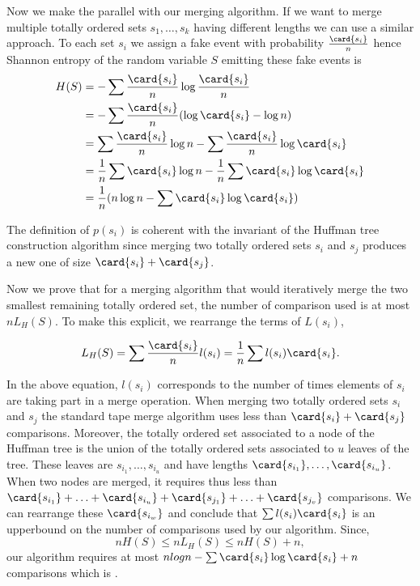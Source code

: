 Now we make the parallel with our merging algorithm. If we want to merge
multiple totally ordered sets \(s_1,\ldots,s_k\) having different lengths we can use a similar
approach. To each set \(s_i\) we assign a fake event with probability
\(\frac{\card{s_i}}{n}\) hence Shannon entropy of the random variable
\(S\) emitting these fake events is
\begin{align}
H(S) &= - \sum \frac{\card{s_i}}{n} \log \frac{\card{s_i}}{n}\\
&= - \sum \frac{\card{s_i}}{n} (\log \card{s_i} - \log n)\\
&= \sum \frac{\card{s_i}}{n} \log n - \sum \frac{\card{s_i}}{n} \log \card{s_i}\\
&= \frac{1}{n} \sum \card{s_i} \log n - \frac{1}{n} \sum \card{s_i} \log \card{s_i}\\
&= \frac{1}{n} (n \log n - \sum \card{s_i} \log \card{s_i})\\
\end{align}

The definition of \(p(s_i)\) is coherent with the invariant of
the Huffman tree construction algorithm since merging two totally ordered sets
\(s_i\) and \(s_j\) produces a new one of size \(\card{s_i} + \card{s_j}\).

Now we prove that for a merging algorithm that would iteratively merge the two
smallest remaining totally ordered set, the number of comparison used is at
most \(n L_H(S)\). To make this explicit, we rearrange the terms of \(L(s_i)\),

\begin{displaymath}
L_H(S) = \sum \frac{\card{s_i}}{n} l(s_i) = \frac{1}{n} \sum l(s_i) \card{s_i}.
\end{displaymath}

In the above equation, \(l(s_i)\) corresponds to the number of times elements
of \(s_i\) are taking part in a merge operation. When merging two totally
ordered sets \(s_i\) and \(s_j\) the standard tape merge algorithm uses less
than \(\card{s_i} + \card{s_j}\) comparisons. Moreover, the totally ordered set
associated to a node of the Huffman tree is the union of the totally ordered
sets associated to \(u\) leaves of the tree. These leaves are
\(s_{i_1},\ldots,s_{i_u}\) and have lengths
\(\card{s_{i_1}},\ldots,\card{s_{i_u}}\). When two nodes are merged, it
requires thus less than
\(\card{s_{i_1}}+\ldots+\card{s_{i_u}}+\card{s_{j_1}}+\ldots+\card{s_{j_v}}\)
comparisons. We can rearrange these \(\card{s_{i_w}}\) and conclude that
\(\sum l(s_i) \card{s_i}\) is an upperbound on the number of comparisons used
by our algorithm. Since,
\begin{displaymath}
n H(S) \le n L_H(S) \le n H(S) + n,
\end{displaymath}
our algorithm requires at most \(n log n - \sum \card{s_i} \log \card{s_i} +
n\) comparisons which is .

